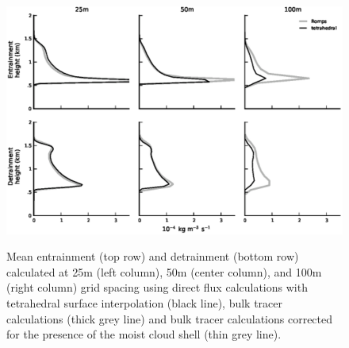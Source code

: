 \documentclass[12pt]{article}
\begin{document}
\begin{figure}[t]
  \noindent\includegraphics[width=39pc,angle=0]{./figures/resolution_dependence}\\
  \caption{Mean entrainment (top row) and detrainment (bottom row) calculated
  at 25m (left column), 50m (center column), and 100m (right column) grid 
  spacing using direct flux calculations with tetrahedral surface interpolation 
  (black line), bulk tracer calculations (thick grey line) and bulk tracer 
  calculations corrected for the presence of the moist cloud shell (thin grey 
  line).}\label{fig:resolution_dependence}
\end{figure}
\end{document}
